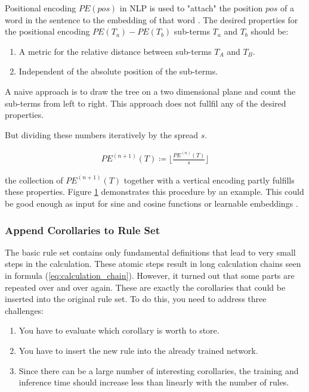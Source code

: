 \documentclass{scrartcl}
\theoremstyle{definition}
\begin{document}
Positional encoding $PE\left( pos\right)$ in NLP is used to "attach" the position $pos$ of a word in the sentence to the embedding of that word \cite{vaswani2017attention}.
The desired properties for the positional encoding $PE\left( T_a \right) - PE\left( T_b \right)$ sub-terms $T_a$ and $T_b$ should be:
\begin{enumerate}[label=(\roman*)]
	\item A metric for the relative distance between sub-terms $T_A$ and $T_B$.
	\item Independent of the absolute position of the sub-terms.
\end{enumerate}

A naive approach is to draw the tree on a two dimensional plane and count the sub-terms from left to right.
This approach does not fullfil any of the desired properties.

But dividing these numbers iteratively by the spread $s$.

\begin{align}
	PE^{(n+1)}\left( T \right) \coloneqq \lfloor \frac{PE^{(n)} \left( T \right)}{s} \rfloor
\end{align}

the collection of $PE^{(n+1)}\left( T \right)$ together with a vertical encoding partly fulfills these properties.
Figure \ref{fig:positional_encoding} demonstrates this procedure by an example.
This could be good enough as input for sine and cosine functions or learnable embeddings \cite{gehring2017convolutional}.

\begin{figure}[!htbp]
	\centering
	
	\label{fig:positional_encoding}
\end{figure}


\subsubsection{Append Corollaries to Rule Set}

The basic rule set contains only fundamental definitions that lead to very small steps in the calculation.
These atomic steps result in long calculation chains seen in formula (\ref{eq:calculation_chain}).
However, it turned out that some parts are repeated over and over again.
These are exactly the corollaries that could be inserted into the original rule set.
To do this, you need to address three challenges:

\begin{enumerate}[label=(\roman*)]
	\item You have to evaluate which corollary is worth to store.
	\item You have to insert the new rule into the already trained network.
	\item Since there can be a large number of interesting corollaries, the training and inference time should increase less than linearly with the number of rules.
\end{enumerate}
\end{document}
